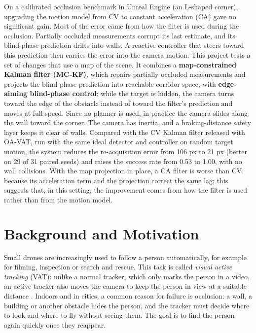 \documentclass[12pt,a4paper]{article}
\begin{document}
On a calibrated occlusion benchmark in Unreal Engine (an L-shaped corner), upgrading the motion model from CV to constant acceleration (CA) gave no significant gain. Most of the error came from how the filter is used during the occlusion. Partially occluded measurements corrupt its last estimate, and its blind-phase prediction drifts into walls. A reactive controller that steers toward this prediction then carries the error into the camera motion. This project tests a set of changes that use a map of the scene. It combines a \textbf{map-constrained Kalman filter (MC-KF)}, which repairs partially occluded measurements and projects the blind-phase prediction into reachable corridor space, with \textbf{edge-aiming blind-phase control}: while the target is hidden, the camera turns toward the edge of the obstacle instead of toward the filter's prediction and moves at full speed. Since no planner is used, in practice the camera slides along the wall toward the corner. The camera has inertia, and a braking-distance safety layer keeps it clear of walls. Compared with the CV Kalman filter released with OA-VAT, run with the same ideal detector and controller on random target motion, the system reduces the re-acquisition error from 106 px to 21 px (better on 29 of 31 paired seeds) and raises the success rate from 0.53 to 1.00, with no wall collisions.
With the map projection in place, a CA filter is worse than CV, because its acceleration term and the projection correct the same lag; this suggests that, in this setting, the improvement comes from how the filter is used rather than from the motion model.

\clearpage
\tableofcontents
\clearpage
\section{Background and Motivation}
Small drones are increasingly used to follow a person automatically, for example for filming, inspection or search and rescue.
This task is called \emph{visual active tracking} (VAT): unlike a normal tracker, which only marks the person in a video, an active tracker also moves the camera to keep the person in view at a suitable distance \cite{r1,r2}.
Indoors and in cities, a common reason for failure is occlusion: a wall, a building or another obstacle hides the person, and the tracker must decide where to look and where to fly without seeing them.
The goal is to find the person again quickly once they reappear.
\end{document}
